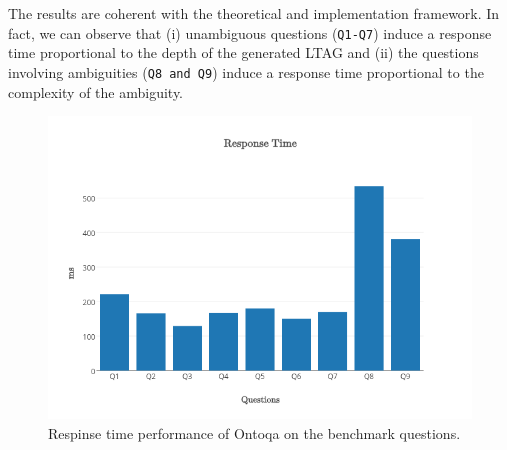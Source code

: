 The results are coherent with the theoretical and implementation framework. In fact, we can observe that (i) unambiguous questions (\texttt{Q1-Q7}) induce a response time proportional to the depth of the generated LTAG and (ii) the questions involving ambiguities (\texttt{Q8 and Q9}) induce a response time proportional to the complexity of the ambiguity.

\begin{figure}[H]
	\centering
	\includegraphics[width=0.8\columnwidth]{./fig/evaluation-response-time}
	\caption{Respinse time performance of Ontoqa on the benchmark questions.}
	\label{fig:evaluation-time}
\end{figure}

